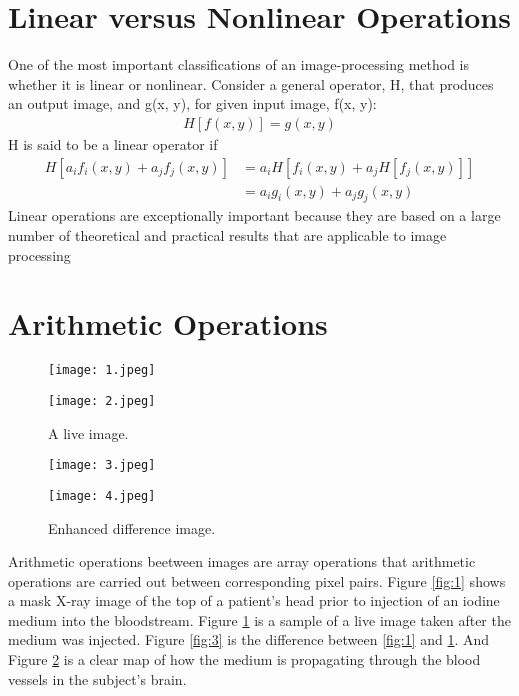 \documentclass[a4paper,11pt]{article}
\begin{document}
\section{Linear versus Nonlinear Operations}
\indent One of the most important classifications of an image-processing method is whether it is linear or nonlinear. Consider a general operator, H, that produces an output image, and g(x, y), for given input image, f(x, y):\\
\begin{gather}
H[f(x, y)] = g(x, y)
\end{gather}
\indent H is said to be a linear operator if\\
\begin{equation}
\begin{split}
H[a_{i}f_{i}(x, y) + a_{j}f_{j}(x, y)] &= a_iH[f_i(x, y)+a_jH[f_j(x, y)]] \\
                                       &=a_ig_i(x, y)+a_jg_j(x, y)
\end{split}
\end{equation}
\indent Linear operations are exceptionally important because they are based on a large number of theoretical and practical results that are applicable to image processing\\
\section{Arithmetic Operations}
\begin{figure}[htbp]
\centering
\begin{minipage}[t]{0.48\textwidth}
\centering
\texttt{[image: 1.jpeg]}
\caption{Mask image.}
\label{fig:1}
\end{minipage}
\begin{minipage}[t]{0.48\textwidth}
\centering
\texttt{[image: 2.jpeg]}
\caption{A live image.}
\label{fig:2}
\end{minipage}
\end{figure}
\begin{figure}[htbp]
\centering
\begin{minipage}[t]{0.48\textwidth}
\centering
\texttt{[image: 3.jpeg]}
\caption{Difference between 1 and 2.}
\label{fig:3}
\end{minipage}
\begin{minipage}[t]{0.48\textwidth}
\centering
\texttt{[image: 4.jpeg]}
\caption{Enhanced difference image.}
\label{fig:4}
\end{minipage}
\end{figure}
\indent Arithmetic operations beetween images are array operations that arithmetic operations are carried out between corresponding pixel pairs. Figure \ref{fig:1} shows a mask X-ray image of the top of a patient's head prior to injection of an iodine medium into the bloodstream. Figure \ref{fig:2} is a sample of a live image taken after the medium was injected. Figure \ref{fig:3} is the difference between \ref{fig:1} and \ref{fig:2}. And Figure \ref{fig:4} is a clear map of how the medium is propagating through the blood vessels in the subject's brain.\\
\end{document}
